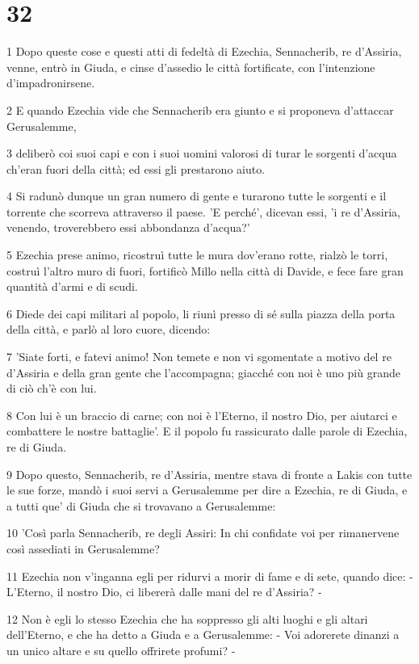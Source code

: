 \chapter{32}

\par 1 Dopo queste cose e questi atti di fedeltà di Ezechia, Sennacherib, re d'Assiria, venne, entrò in Giuda, e cinse d'assedio le città fortificate, con l'intenzione d'impadronirsene.
\par 2 E quando Ezechia vide che Sennacherib era giunto e si proponeva d'attaccar Gerusalemme,
\par 3 deliberò coi suoi capi e con i suoi uomini valorosi di turar le sorgenti d'acqua ch'eran fuori della città; ed essi gli prestarono aiuto.
\par 4 Si radunò dunque un gran numero di gente e turarono tutte le sorgenti e il torrente che scorreva attraverso il paese. 'E perché', dicevan essi, 'i re d'Assiria, venendo, troverebbero essi abbondanza d'acqua?'
\par 5 Ezechia prese animo, ricostruì tutte le mura dov'erano rotte, rialzò le torri, costruì l'altro muro di fuori, fortificò Millo nella città di Davide, e fece fare gran quantità d'armi e di scudi.
\par 6 Diede dei capi militari al popolo, li riunì presso di sé sulla piazza della porta della città, e parlò al loro cuore, dicendo:
\par 7 'Siate forti, e fatevi animo! Non temete e non vi sgomentate a motivo del re d'Assiria e della gran gente che l'accompagna; giacché con noi è uno più grande di ciò ch'è con lui.
\par 8 Con lui è un braccio di carne; con noi è l'Eterno, il nostro Dio, per aiutarci e combattere le nostre battaglie'. E il popolo fu rassicurato dalle parole di Ezechia, re di Giuda.
\par 9 Dopo questo, Sennacherib, re d'Assiria, mentre stava di fronte a Lakis con tutte le sue forze, mandò i suoi servi a Gerusalemme per dire a Ezechia, re di Giuda, e a tutti que' di Giuda che si trovavano a Gerusalemme:
\par 10 'Così parla Sennacherib, re degli Assiri: In chi confidate voi per rimanervene così assediati in Gerusalemme?
\par 11 Ezechia non v'inganna egli per ridurvi a morir di fame e di sete, quando dice: - L'Eterno, il nostro Dio, ci libererà dalle mani del re d'Assiria? -
\par 12 Non è egli lo stesso Ezechia che ha soppresso gli alti luoghi e gli altari dell'Eterno, e che ha detto a Giuda e a Gerusalemme: - Voi adorerete dinanzi a un unico altare e su quello offrirete profumi? -
